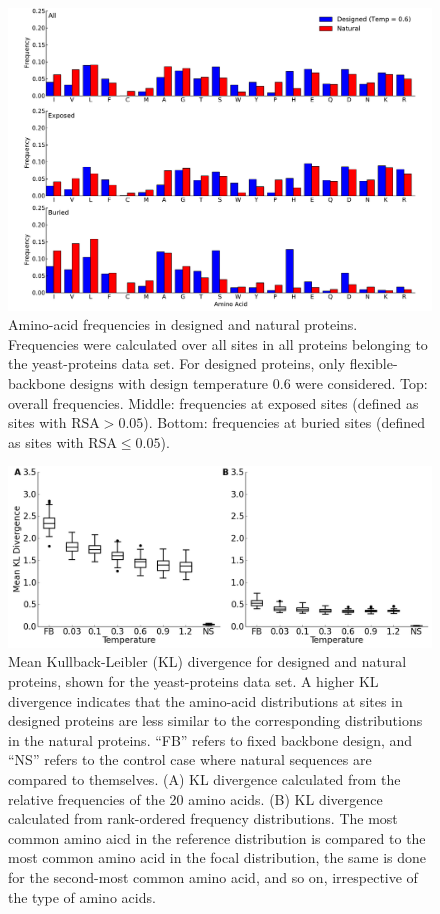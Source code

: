 \documentclass[12pt]{article}
\begin{document}
\begin{figure}[H]
\centerline{\includegraphics[width = 5in]{figures/Duncan_Freq_Combo_Plots_06.pdf}}
\caption{Amino-acid frequencies in designed and natural proteins. Frequencies were calculated over all sites in all proteins belonging to the yeast-proteins data set. For designed proteins, only flexible-backbone designs with design temperature 0.6 were considered. Top: overall frequencies. Middle: frequencies at exposed sites (defined as sites with $\text{RSA}>0.05$). Bottom: frequencies at buried sites (defined as sites with $\text{RSA}\leq0.05$).}
\label{AAFreqsYeastProteins}
\end{figure}


\begin{figure}[H]
\centerline{\includegraphics[width = 6in]{figures/Mean_KL_vs_Temp_Boxplot.png}}
\caption{Mean Kullback-Leibler (KL) divergence for designed and natural proteins, shown for the yeast-proteins data set. A higher KL divergence indicates that the amino-acid distributions at sites in designed proteins are less similar to the corresponding distributions in the natural proteins. ``FB'' refers to fixed backbone design, and ``NS'' refers to the control case where natural sequences are compared to themselves. (A) KL divergence calculated from the relative frequencies of the 20 amino acids. (B) KL divergence calculated from rank-ordered frequency distributions. The most common amino aicd in the reference distribution is compared to the most common amino acid in the focal distribution, the same is done for the second-most common amino acid, and so on, irrespective of the type of amino acids.}
\label{AADisFig1}
\end{figure}
\end{document}
